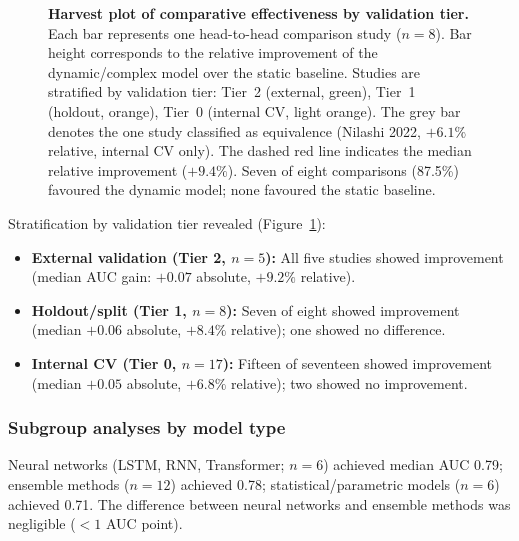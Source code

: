 \documentclass[11pt,a4paper]{article}
\begin{document}
\begin{figure}[H]
\caption{\textbf{Harvest plot of comparative effectiveness by validation tier.} Each bar represents one head-to-head comparison study ($n=8$). Bar height corresponds to the relative improvement of the dynamic/complex model over the static baseline. Studies are stratified by validation tier: Tier~2 (external, green), Tier~1 (holdout, orange), Tier~0 (internal CV, light orange). The grey bar denotes the one study classified as equivalence (Nilashi 2022, $+6.1\%$ relative, internal CV only). The dashed red line indicates the median relative improvement ($+9.4\%$). Seven of eight comparisons (87.5\%) favoured the dynamic model; none favoured the static baseline.}
\label{fig:harvest}
\end{figure}

Stratification by validation tier revealed (Figure~\ref{fig:harvest}):
\begin{itemize}[leftmargin=*]
    \item \textbf{External validation (Tier 2, $n=5$):} All five studies showed improvement (median AUC gain: $+0.07$ absolute, $+9.2\%$ relative).
    \item \textbf{Holdout/split (Tier 1, $n=8$):} Seven of eight showed improvement (median $+0.06$ absolute, $+8.4\%$ relative); one showed no difference.
    \item \textbf{Internal CV (Tier 0, $n=17$):} Fifteen of seventeen showed improvement (median $+0.05$ absolute, $+6.8\%$ relative); two showed no improvement.
\end{itemize}

\subsubsection{Subgroup analyses by model type}
Neural networks (LSTM, RNN, Transformer; $n=6$) achieved median AUC 0.79; ensemble methods ($n=12$) achieved 0.78; statistical/parametric models ($n=6$) achieved 0.71. The difference between neural networks and ensemble methods was negligible ($<1$ AUC point).
\end{document}
